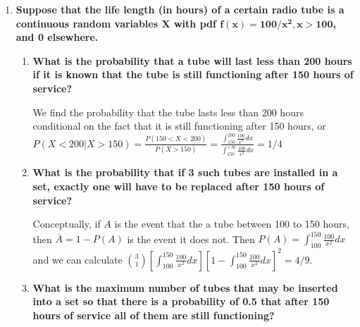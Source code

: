 \documentclass[10pt, oneside]{article}
\begin{document}
\begin{enumerate}[label=4.\arabic*]
Equivalently, we find the probability that 0, 1, or 2 items are defective. In choosing 10 items with a 5 percent probability of defectiveness on the production line, we calculate $\sum^2_{i=0} \binom{10}{i} (0.05)^i (1-0.95)^{10-i} = \boxed{0.988}$.

\item  \begin{tcolorbox}[
  colback=Cerulean!5!white,
  colframe=Cerulean!75!black]
\textbf{Suppose that the life length (in hours) of a certain radio tube is a continuous random variables $\bm{X}$ with pdf $\bm{f(x) = 100/x^2, x > 100}$, and 0 elsewhere.}
\end{tcolorbox}

	\begin{enumerate}
	\item  \begin{tcolorbox}[
	  colback=Cerulean!5!white,
	  colframe=Cerulean!75!black]
	\textbf{What is the probability that a tube will last less than 200 hours if it is known that the tube is still functioning after 150 hours of service?}
	\end{tcolorbox}
	
	We find the probability that the tube lasts less than 200 hours conditional on the fact that it is still functioning after 150 hours, or $P(X < 200 | X > 150) = \frac{P(150 < X < 200)}{P(X > 150)} = \frac{\int^{200}_{150} \frac{100}{x^2} dx }{\int^{+\infty}_{150} \frac{100}{x^2} dx} = \boxed{1/4}$
	
	\item  \begin{tcolorbox}[
	  colback=Cerulean!5!white,
	  colframe=Cerulean!75!black]
	\textbf{What is the probability that if 3 such tubes are installed in a set, exactly one will have to be replaced after 150 hours of service?}
	\end{tcolorbox}
	
	Conceptually, if $A$ is the event that the a tube between 100 to 150 hours, then $\bar{A} = 1 - P(A)$ is the event it does not. Then $P(A) = \int^{150}_{100} \frac{100}{x^2}dx$ and we can calculate $\binom{3}{1} [\int^{150}_{100} \frac{100}{x^2} dx] [1 - \int^{150}_{100} \frac{100}{x^2} dx]^2 = \boxed{4/9}$.
	
	\item  \begin{tcolorbox}[
	  colback=Cerulean!5!white,
	  colframe=Cerulean!75!black]
	\textbf{What is the maximum number of tubes that may be inserted into a set so that there is a probability of 0.5 that after 150 hours of service all of them are still functioning?}
	\end{tcolorbox}
	

\end{enumerate}
\end{enumerate}
\end{document}
